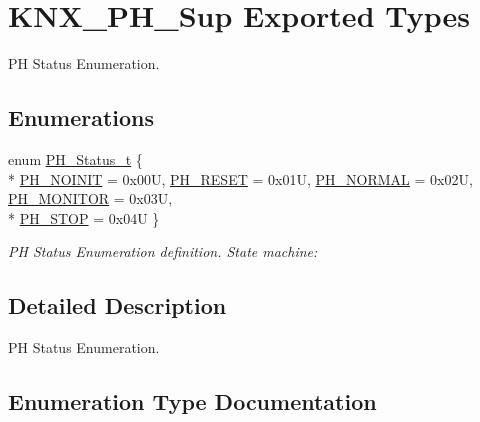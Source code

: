 \hypertarget{group___k_n_x___p_h___sup___exported___types}{}\section{K\+N\+X\+\_\+\+P\+H\+\_\+\+Sup Exported Types}
\label{group___k_n_x___p_h___sup___exported___types}


PH Status Enumeration.  


\subsection*{Enumerations}
\begin{DoxyCompactItemize}
\item 
enum \hyperlink{group___k_n_x___p_h___sup___exported___types_ga5b665a94bef912fbfbea7cc949ed0e49}{P\+H\+\_\+\+Status\+\_\+t} \{ \\*
\hyperlink{group___k_n_x___p_h___sup___exported___types_gga5b665a94bef912fbfbea7cc949ed0e49a329f30393c5729b777643b93478de68c}{P\+H\+\_\+\+N\+O\+I\+N\+IT} = 0x00U, 
\hyperlink{group___k_n_x___p_h___sup___exported___types_gga5b665a94bef912fbfbea7cc949ed0e49a69a4299f68e66ea3fbe9477582ac02cd}{P\+H\+\_\+\+R\+E\+S\+ET} = 0x01U, 
\hyperlink{group___k_n_x___p_h___sup___exported___types_gga5b665a94bef912fbfbea7cc949ed0e49a4be7dd56ae47b708c6f4751714efe930}{P\+H\+\_\+\+N\+O\+R\+M\+AL} = 0x02U, 
\hyperlink{group___k_n_x___p_h___sup___exported___types_gga5b665a94bef912fbfbea7cc949ed0e49a0cd2cf806d22fe2f69ac027782ddbf15}{P\+H\+\_\+\+M\+O\+N\+I\+T\+OR} = 0x03U, 
\\*
\hyperlink{group___k_n_x___p_h___sup___exported___types_gga5b665a94bef912fbfbea7cc949ed0e49ae9fe73aeee988939ec19ed18c57250dc}{P\+H\+\_\+\+S\+T\+OP} = 0x04U
 \}\begin{DoxyCompactList}\small\item\em PH Status Enumeration definition. State machine\+: \end{DoxyCompactList}
\end{DoxyCompactItemize}


\subsection{Detailed Description}
PH Status Enumeration. 



\subsection{Enumeration Type Documentation}
